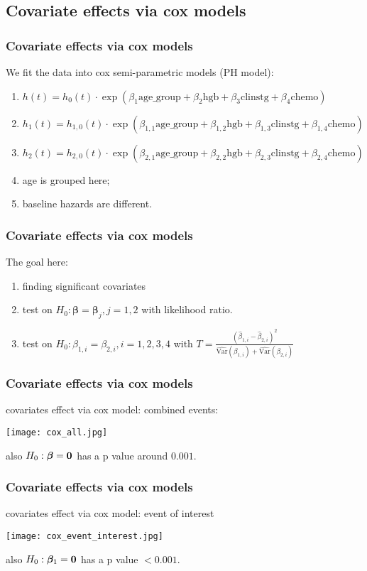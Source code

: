\documentclass{beamer}[10]
\begin{document}
\subsection{Covariate effects via cox models}
\begin{frame}
	\frametitle{Covariate effects via cox models}
	We fit the data into cox semi-parametric models (PH model):
	\begin{enumerate}
		\item $h(t) = h_0(t)\cdot \exp(\beta_1\text{age}\_\text{group} + \beta_2\text{hgb} + \beta_3\text{clinstg} + \beta_4\text{chemo}) $
		\item $h_1(t) = h_{1, 0}(t)\cdot \exp(\beta_{1, 1}\text{age}\_\text{group} + \beta_{1, 2}\text{hgb} + \beta_{1, 3}\text{clinstg} + \beta_{1,4}\text{chemo})$
		\item $h_2(t) = h_{2,  0}(t)\cdot \exp(\beta_{2, 1}\text{age}\_\text{group} + \beta_{2, 2}\text{hgb} + \beta_{2, 3}\text{clinstg} + \beta_{2,4}\text{chemo}) $
		\item age is grouped here;
		\item baseline hazards are different.
	\end{enumerate}
\end{frame}
\begin{frame}
	\frametitle{Covariate effects via cox models}
	The goal here:
		\begin{enumerate}
			\item finding significant covariates
			\item test on $H_0: {\bm \beta} = {\bm \beta}_j, j = 1, 2$ with likelihood ratio.
			\item test on $H_0: \beta_{1, i}= \beta_{2, i}, i = 1, 2, 3, 4$ with $T = \frac{(\hat{\beta}_{1, i} - \hat{\beta}_{2, i})^2}{\hat{\text{Var}}(\beta_{1, i}) + \hat{\text{Var}}(\beta_{2, i})}$
		\end{enumerate}
\end{frame}
\begin{frame}
	\frametitle{Covariate effects via cox models}
	covariates effect via cox model: combined events:
	\begin{center}
		\texttt{[image: cox\_all.jpg]}
	\end{center}
	also $H_0: {\bm \beta} = {\bf 0}$ has a p value around $0.001$.
\end{frame}
\begin{frame}
	\frametitle{Covariate effects via cox models}
	covariates effect via cox model: event of interest
	\begin{center}
		\texttt{[image: cox\_event\_interest.jpg]}
	\end{center}
	also $H_0: {\bm \beta}_1 = {\bf 0}$ has a p value $<0.001$.
\end{frame}
\end{document}
